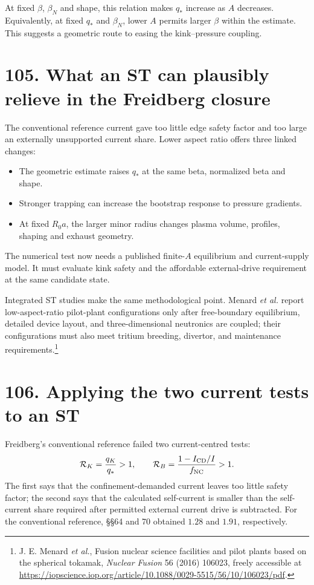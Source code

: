 \documentclass[11pt]{article}
\begin{document}
At fixed $\beta$, $\beta_N$ and shape, this relation makes $q_*$ increase as $A$
decreases. Equivalently, at fixed $q_*$ and $\beta_N$, lower $A$ permits larger
$\beta$ within the estimate. This suggests a geometric route to easing the
kink--pressure coupling.


\section*{105. What an ST can plausibly relieve in the Freidberg closure}
The conventional reference current gave too little edge safety factor and too large
an externally unsupported current share. Lower aspect ratio offers three linked changes:
\begin{itemize}
\item The geometric estimate raises $q_*$ at the same beta, normalized beta and shape.
\item Stronger trapping can increase the bootstrap response to pressure gradients.
\item At fixed $R_0a$, the larger minor radius changes plasma volume, profiles,
shaping and exhaust geometry.
\end{itemize}
The numerical test now needs a published finite-$A$ equilibrium and current-supply
model. It must evaluate kink safety and the affordable external-drive requirement
at the same candidate state.

Integrated ST studies make the same methodological point. Menard \emph{et al.}
report low-aspect-ratio pilot-plant configurations only after free-boundary
equilibrium, detailed device layout, and three-dimensional neutronics are coupled;
their configurations must also meet tritium breeding, divertor, and maintenance
requirements.\footnote{J. E. Menard \emph{et al.}, Fusion nuclear science
facilities and pilot plants based on the spherical tokamak, \emph{Nuclear Fusion}
56 (2016) 106023, freely accessible at
\url{https://iopscience.iop.org/article/10.1088/0029-5515/56/10/106023/pdf}.}

\section*{106. Applying the two current tests to an ST}
Freidberg's conventional reference failed two current-centred tests:
\[
 {\cal R}_{K}=\frac{q_K}{q_*}>1,\qquad
 {\cal R}_{B}=\frac{1-I_{\rm CD}/I}{f_{\rm NC}}>1.
\]
The first says that the confinement-demanded current leaves too little safety factor;
the second says that the calculated self-current is smaller than the self-current
share required after permitted external current drive is subtracted. For the
conventional reference, \S\S64 and 70 obtained $1.28$ and $1.91$, respectively.
\end{document}
